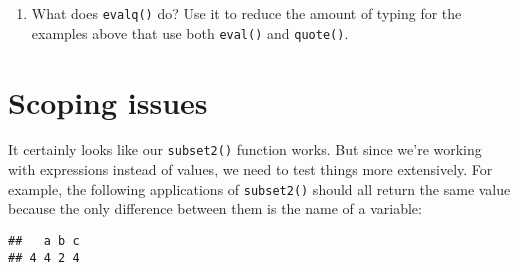 \begin{enumerate}
\begin{Shaded}
\begin{Highlighting}[]
\StringTok{ }
\StringTok{ }
\StringTok{ }\NormalTok{(}\NormalTok{(}
\StringTok{ }
\NormalTok{  df[, pos, drop =}\StringTok{ }\NormalTok{]}
\NormalTok{\}}
\OperatorTok{-}
\end{Highlighting}
\end{Shaded}
\item
  What does \texttt{evalq()} do? Use it to reduce the amount of typing
  for the examples above that use both \texttt{eval()} and
  \texttt{quote()}.
\end{enumerate}

\hypertarget{scoping-issues}{%
\section{Scoping issues}\label{scoping-issues}}

It certainly looks like our \texttt{subset2()} function works. But since
we're working with expressions instead of values, we need to test things
more extensively. For example, the following applications of
\texttt{subset2()} should all return the same value because the only
difference between them is the name of a variable:

\begin{Shaded}
\begin{Highlighting}[]
\StringTok{ }
\StringTok{ }
\StringTok{ }
\StringTok{ }

\OperatorTok{==}\StringTok{ }\NormalTok{)}
\end{Highlighting}
\end{Shaded}

\begin{verbatim}
##   a b c
## 4 4 2 4
\end{verbatim}

\begin{Shaded}
\begin{Highlighting}[]
\OperatorTok{==}\StringTok{ }
\end{Highlighting}
\end{Shaded}

